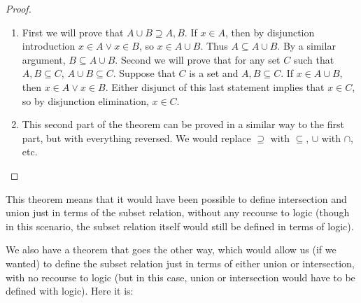 \documentclass[12pt]{article}
\begin{document}
\begin{proof}
  \begin{enumerate}[label=\alph*)]
    \item First we will prove that $A\cup B\supseteq A,B$.  If $x\in
      A$, then by disjunction introduction $x\in A \vee x\in B$, so
      $x\in A\cup B$.  Thus $A\subseteq A\cup B$.  By a similar
      argument, $B\subseteq A\cup B$.  Second we will prove that for
      any set $C$ such that $A,B\subseteq C$, $A\cup B\subseteq C$.
      Suppose that $C$ is a set and $A,B\subseteq C$.  If $x\in A\cup
      B$, then $x\in A \vee x\in B$.  Either disjunct of this last
      statement implies that $x\in C$, so by disjunction elimination,
      $x\in C$.
    \item This second part of the theorem can be proved in a similar
      way to the first part, but with everything reversed.  We would
      replace $\supseteq$ with $\subseteq$, $\cup$ with $\cap$, etc.
  \end{enumerate}
\end{proof}

This theorem means that it would have been possible to define
intersection and union just in terms of the subset relation, without
any recourse to logic (though in this scenario, the subset relation
itself would still be defined in terms of logic).

We also have a theorem that goes the other way, which would allow us
(if we wanted) to define the subset relation just in terms of either
union or intersection, with no recourse to logic (but in this case,
union or intersection would have to be defined with logic).  Here it
is:
\end{document}

